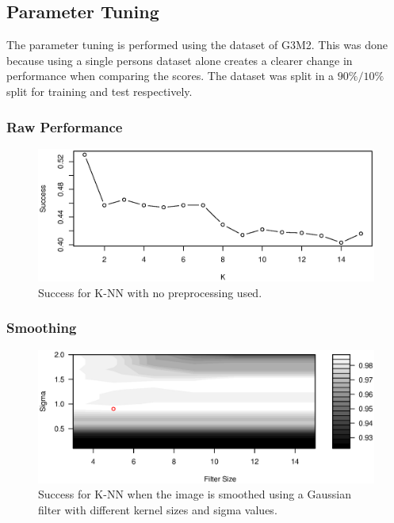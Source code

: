 \subsection{Parameter Tuning}
The parameter tuning is performed using the dataset of G3M2.
This was done because using a single persons dataset alone creates a clearer change in performance when comparing the scores.
The dataset was split in a $90\%/10\%$ split for training and test respectively.


\subsubsection{Raw Performance}

\begin{figure}[H]
\centering
\includegraphics[width = 1 \textwidth]{graphics/knn_raw_success}
\caption{Success for K-NN with no preprocessing used.}
\end{figure}


\subsubsection{Smoothing}

\begin{figure}[H]
\centering
\includegraphics[width = 1 \textwidth]{graphics/knn_smooth_cont}
\caption{Success for K-NN when the image is smoothed using a Gaussian filter with different kernel sizes and sigma values.}
\end{figure}


